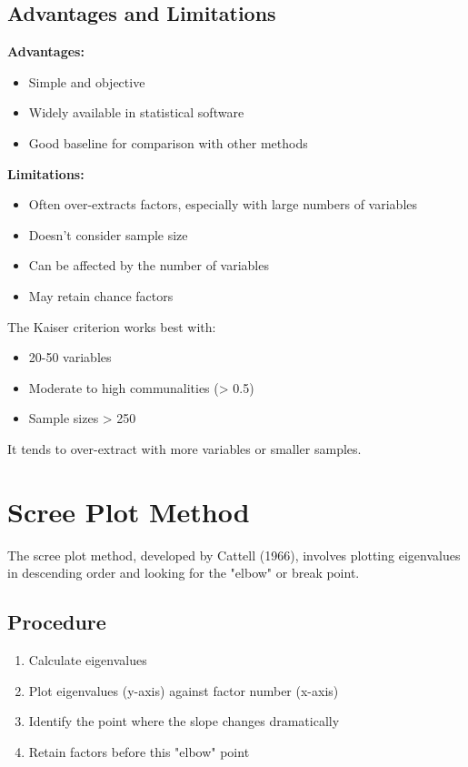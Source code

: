 \documentclass[a4paper]{tufte-book}
\begin{document}
\subsection{Advantages and Limitations}

\textbf{Advantages:}
\begin{itemize}
\item Simple and objective
\item Widely available in statistical software
\item Good baseline for comparison with other methods
\end{itemize}

\textbf{Limitations:}
\begin{itemize}
\item Often over-extracts factors, especially with large numbers of variables
\item Doesn't consider sample size
\item Can be affected by the number of variables
\item May retain chance factors
\end{itemize}

\begin{learningtip}
The Kaiser criterion works best with:
\begin{itemize}
\item 20-50 variables
\item Moderate to high communalities (> 0.5)
\item Sample sizes > 250
\end{itemize}
It tends to over-extract with more variables or smaller samples.
\end{learningtip}

\section{Scree Plot Method}

The scree plot method, developed by Cattell (1966), involves plotting eigenvalues in descending order and looking for the "elbow" or break point.

\subsection{Procedure}

\begin{enumerate}
\item Calculate eigenvalues
\item Plot eigenvalues (y-axis) against factor number (x-axis)
\item Identify the point where the slope changes dramatically
\item Retain factors before this "elbow" point
\end{enumerate}
\end{document}
